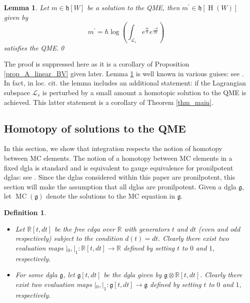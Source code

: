 \documentclass[]{amsart}
\newtheorem{definition}[theorem]{Definition}
\newtheorem{lemma}[theorem]{Lemma}
\theoremstyle{definition}
\newcommand{\MC}{\operatorname{MC}}
\newcommand{\homology}{\operatorname{H}}
\begin{document}
\begin{lemma}\label{lem_qBV}
Let $m\in\mathfrak{h}[W]$ be a solution to the QME, then $m^\prime\in\mathfrak{h}[\homology (W)]$ given by
\[
m^\prime=\hbar \log \left(\int_{\mathcal{L}_s} e^{\frac{m}{\hbar} } e^{\frac{-\sigma}{2\hbar}} \right)
\]
satisfies the QME.\qed
\end{lemma}

The proof is suppressed here as it is a corollary of Proposition \ref{prop_A_linear_BV} given later. Lemma \ref{lem_qBV} is well known in various guises: see \cite{cattaneo_mnev,costello,krotov_losev}. In fact, in loc. cit. the lemma includes an additional statement: if the Lagrangian subspace $\mathcal{L}_s$ is perturbed by a small amount a homotopic solution to the QME is achieved. This latter statement is a corollary of Theorem \ref{thm_main}.

\subsection{Homotopy of solutions to the QME}

In this section, we show that integration respects the notion of homotopy between MC elements. The notion of a homotopy between MC elements in a fixed dgla is standard and is equivalent to gauge equivalence for pronilpotent dglas: see \cite{braun_laz_unimodular,schlessinger_stasheff_deformation_rational,voronov_non-abelian}. Since the dglas considered within this paper are pronilpotent, this section will make the assumption that all dglas are pronilpotent. Given a dgla $\mathfrak{g}$, let $\MC(\mathfrak{g})$ denote the solutions to the MC equation in $\mathfrak{g}$.

\begin{definition}\hfill
\begin{itemize}
\item Let $\mathbb{R}[t,dt]$ be the free cdga over $\mathbb{R}$ with generators $t$ and $dt$ (even and odd respectively) subject to the condition $d(t)=dt$. Clearly there exist two evaluation maps $|_0 , |_1 \colon \mathbb{R}[t,dt]\to \mathbb{R}$ defined by setting $t$ to $0$ and $1$, respectively.
\item For some dgla $\mathfrak{g}$, let $\mathfrak{g}[t,dt]$ be the dgla given by $\mathfrak{g}\otimes \mathbb{R}[t,dt]$. Clearly there exist two evaluation maps $|_0 , |_1 \colon\mathfrak{g}[t,dt]\to \mathfrak{g}$ defined by setting $t$ to $0$ and $1$, respectively.
\end{itemize}
\end{definition}
\end{document}
